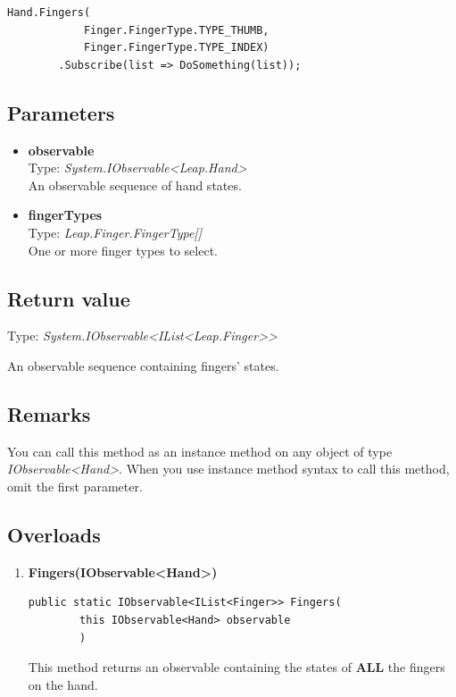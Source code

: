 \documentclass[12pt,a4paper,twoside]{report}
\begin{document}
\begin{lstlisting}[caption=Usage example]
    Hand.Fingers(
            Finger.FingerType.TYPE_THUMB,
            Finger.FingerType.TYPE_INDEX)
        .Subscribe(list => DoSomething(list));
\end{lstlisting}

\subsection{Parameters}
\begin{itemize}
    \item \textbf{observable} \\
        Type: \textit{System.IObservable<Leap.Hand>} \\
        An observable sequence of hand states.
    \item \textbf{fingerTypes} \\
        Type: \textit{Leap.Finger.FingerType[]} \\
        One or more finger types to select.
\end{itemize}

\subsection{Return value}
Type: \textit{System.IObservable<IList<Leap.Finger>{}>}

An observable sequence containing fingers' states.

\subsection{Remarks}
You can call this method as an instance method on any object of type \textit{IObservable<Hand>}. When you use 
instance method syntax to call this method, omit the first parameter.

\subsection{Overloads}
\begin{enumerate}
    \item \textbf{Fingers(IObservable<Hand>)}\\
\begin{lstlisting}[caption=Declaration]
    public static IObservable<IList<Finger>> Fingers(
        this IObservable<Hand> observable
        )
\end{lstlisting}

This method returns an observable containing the states of \textbf{ALL} the fingers on the hand.
\end{enumerate}
\end{document}
